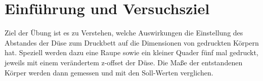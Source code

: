 \documentclass[a4paper,12pt,bibtotocnumbered]{scrartcl}
\numberwithin{equation}{section} %
\begin{document}
\thispagestyle{empty}
\tableofcontents 
\clearpage %


\renewcommand{\thepage}{\arabic{page}}
\setcounter{page}{1}



\listoffigures
{}

\listoftables
{}

\newpage
\onehalfspacing 

\section[Einführung]{Einführung und Versuchsziel}
Ziel der Übung ist es zu Verstehen, welche Auswirkungen die Einstellung des Abstandes der Düse zum Druckbett auf die Dimensionen von gedruckten Körpern hat. Speziell werden dazu eine Raupe sowie ein kleiner Quader fünf mal gedruckt, jeweils mit einem verändertem z-offset der Düse. Die Maße der entstandenen Körper werden dann gemessen und mit den Soll-Werten verglichen.
\end{document}
